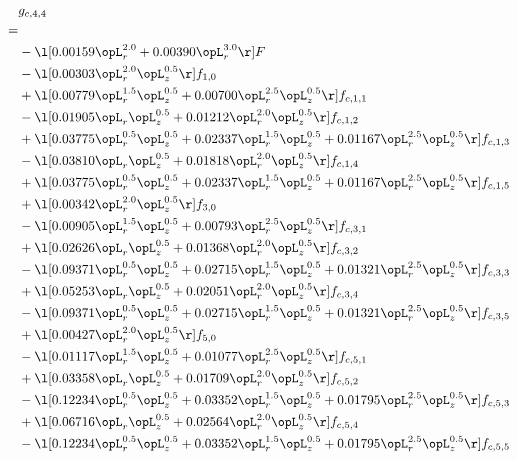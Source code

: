 \begin{alignat}{2} 
\label{eq:g_44_0} 
& g_{c,4,4} \nonumber \\ 
 = \\ 
& - \l[  0.00159 \opL_r^{2.0} +  0.00390 \opL_r^{3.0}  \r] F \nonumber \\ 
& - \l[  0.00303 \opL_r^{2.0} \opL_z^{0.5}  \r] f_{1,0} \nonumber \\ 
& + \l[  0.00779 \opL_r^{1.5} \opL_z^{0.5} +  0.00700 \opL_r^{2.5} \opL_z^{0.5}  \r] f_{c,1,1} \nonumber \\ 
& - \l[  0.01905 \opL_r \opL_z^{0.5} +  0.01212 \opL_r^{2.0} \opL_z^{0.5}  \r] f_{c,1,2} \nonumber \\ 
& + \l[  0.03775 \opL_r^{0.5} \opL_z^{0.5} +  0.02337 \opL_r^{1.5} \opL_z^{0.5} +  0.01167 \opL_r^{2.5} \opL_z^{0.5}  \r] f_{c,1,3} \nonumber \\ 
& - \l[  0.03810 \opL_r \opL_z^{0.5} +  0.01818 \opL_r^{2.0} \opL_z^{0.5}  \r] f_{c,1,4} \nonumber \\ 
& + \l[  0.03775 \opL_r^{0.5} \opL_z^{0.5} +  0.02337 \opL_r^{1.5} \opL_z^{0.5} +  0.01167 \opL_r^{2.5} \opL_z^{0.5}  \r] f_{c,1,5} \nonumber \\ 
& + \l[  0.00342 \opL_r^{2.0} \opL_z^{0.5}  \r] f_{3,0} \nonumber \\ 
& - \l[  0.00905 \opL_r^{1.5} \opL_z^{0.5} +  0.00793 \opL_r^{2.5} \opL_z^{0.5}  \r] f_{c,3,1} \nonumber \\ 
& + \l[  0.02626 \opL_r \opL_z^{0.5} +  0.01368 \opL_r^{2.0} \opL_z^{0.5}  \r] f_{c,3,2} \nonumber \\ 
& - \l[  0.09371 \opL_r^{0.5} \opL_z^{0.5} +  0.02715 \opL_r^{1.5} \opL_z^{0.5} +  0.01321 \opL_r^{2.5} \opL_z^{0.5}  \r] f_{c,3,3} \nonumber \\ 
& + \l[  0.05253 \opL_r \opL_z^{0.5} +  0.02051 \opL_r^{2.0} \opL_z^{0.5}  \r] f_{c,3,4} \nonumber \\ 
& - \l[  0.09371 \opL_r^{0.5} \opL_z^{0.5} +  0.02715 \opL_r^{1.5} \opL_z^{0.5} +  0.01321 \opL_r^{2.5} \opL_z^{0.5}  \r] f_{c,3,5} \nonumber \\ 
& + \l[  0.00427 \opL_r^{2.0} \opL_z^{0.5}  \r] f_{5,0} \nonumber \\ 
& - \l[  0.01117 \opL_r^{1.5} \opL_z^{0.5} +  0.01077 \opL_r^{2.5} \opL_z^{0.5}  \r] f_{c,5,1} \nonumber \\ 
& + \l[  0.03358 \opL_r \opL_z^{0.5} +  0.01709 \opL_r^{2.0} \opL_z^{0.5}  \r] f_{c,5,2} \nonumber \\ 
& - \l[  0.12234 \opL_r^{0.5} \opL_z^{0.5} +  0.03352 \opL_r^{1.5} \opL_z^{0.5} +  0.01795 \opL_r^{2.5} \opL_z^{0.5}  \r] f_{c,5,3} \nonumber \\ 
& + \l[  0.06716 \opL_r \opL_z^{0.5} +  0.02564 \opL_r^{2.0} \opL_z^{0.5}  \r] f_{c,5,4} \nonumber \\ 
& - \l[  0.12234 \opL_r^{0.5} \opL_z^{0.5} +  0.03352 \opL_r^{1.5} \opL_z^{0.5} +  0.01795 \opL_r^{2.5} \opL_z^{0.5}  \r] f_{c,5,5} \nonumber \\ 
\end{alignat} 


